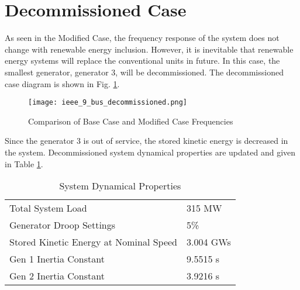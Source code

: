 \section{Decommissioned Case}
As seen in the Modified Case, the frequency response of the system does not change with renewable energy inclusion. However, it is inevitable that renewable energy systems will replace the conventional units in future. In this case, the smallest generator, generator 3, will be decommissioned. The decommissioned case diagram is shown in Fig. \ref{decommissioned_case}.\par
\begin{figure}[h!]
	\centering
	\texttt{[image: ieee\_9\_bus\_decommissioned.png]}
	\caption{Comparison of Base Case and Modified Case Frequencies}
	\label{decommissioned_case}
\end{figure}
Since the generator 3 is out of service, the stored kinetic energy is decreased in the system. Decommissioned system dynamical properties are updated and given in Table \ref{systemdynamicaldatacase3}.
\begin{table}[]
	\centering
	\begin{tabular}{ll}
		\hline
		Total System Load                      & 315 MW    \\
		Generator Droop Settings               & 5\%       \\
		Stored Kinetic Energy at Nominal Speed & 3.004 GWs \\
		Gen 1 Inertia Constant                 & 9.5515 s  \\
		Gen 2 Inertia Constant                 & 3.9216 s  \\
		\hline
	\end{tabular}
	\caption{System Dynamical Properties}
	\label{systemdynamicaldatacase3}
\end{table}
